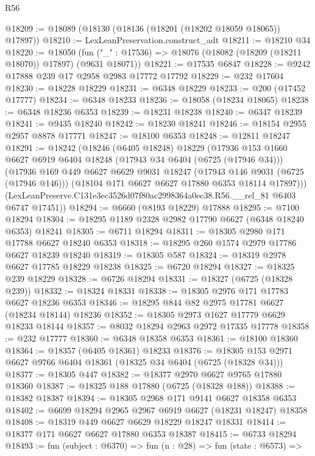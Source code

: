 \begin{lexlean}{R56}
\begin{coremodule}
@18209 := @18089 (@18130 (@18136 (@18201 (@18202 @18059 @18065)) @17897))
@18210 := LexLeanPreservation.construct_adt
@18211 := @18210 @34
@18220 := @18050
    (fun ("_" : @17536) => @18076 (@18082 (@18209 (@18211 @18070)) @17897) (@9631 @18071))
@18221 := @17535 @6847
@18228 := @9242 @17888 @239 @17 @2958 @2983 @17772 @17792
@18229 := @232 @17604
@18230 := @18228 @18229
@18231 := @6348 @18229
@18233 := @200 (@17452 @17777)
@18234 := @6348 @18233
@18236 := @18058 (@18234 @18065)
@18238 := @6348 @18236 @6353
@18239 := @18231 @18238
@18240 := @6347 @18239
@18241 := @9435 @18240
@18242 := @18230 @18241
@18246 := @18154 @2955 @2957 @8878 @17771
@18247 := @18100 @6353
@18248 := @12811 @18247
@18291 := @18242
    (@18246
      (@6405 @18248)
      @18229
      (@17936
        @153
        @1660
        @6627
        @6919
        @6404
        @18248
        (@17943 @34 @6404 (@6725 (@17946 @34)))
        (@17936
          @169
          @449
          @6627
          @6629
          @9031
          @18247
          (@17943 @146 @9031 (@6725 (@17946 @146)))
          (@18104 @171 @6627 @6627 @17880 @6353 @18114 @17897)))
      (LexLeanPreserve.C131e3ec3526d07f80ac2998364a0ec38.R56.__rel_81 @6403 @6747 @17451))
@18294 := @6660 (@8193 @18229) @17888
@18295 := @7100 @18294
@18304 := @18295 @1189 @2328 @2982 @17790 @6627 (@6348 @18240 @6353) @18241
@18305 := @6711 @18294
@18311 := @18305 @2980 @171 @17788 @6627 @18240 @6353
@18318 := @18295 @260 @1574 @2979 @17786 @6627 @18239 @18240
@18319 := @18305 @587
@18324 := @18319 @2978 @6627 @17785 @18229 @18238
@18325 := @6720 @18294
@18327 := @18325 @239 @18229
@18328 := @6726 @18294
@18331 := @18327 (@6725 (@18328 @239))
@18332 := @18324 @18331
@18338 := @18305 @2976 @171 @17783 @6627 @18236 @6353
@18346 := @18295 @844 @82 @2975 @17781 @6627 (@18234 @18144) @18236
@18352 := @18305 @2973 @1627 @17779 @6629 @18233 @18144
@18357 := @8032 @18294 @2963 @2972 @17335 @17778
@18358 := @232 @17777
@18360 := @6348 @18358 @6353
@18361 := @18100 @18360
@18364 := @18357 (@6405 @18361) @18233
@18376 := @18305 @153 @2971 @6627 @9766 @6404 @18361 (@18325 @34 @6404 (@6725 (@18328 @34)))
@18377 := @18305 @447
@18382 := @18377 @2970 @6627 @9765 @17880 @18360
@18387 := @18325 @188 @17880 (@6725 (@18328 @188))
@18388 := @18382 @18387
@18394 := @18305 @2968 @171 @9141 @6627 @18358 @6353
@18402 := @6699 @18294 @2965 @2967 @6919 @6627 (@18231 @18247) @18358
@18408 := @18319 @449 @6627 @6629 @18229 @18247 @18331
@18414 := @18377 @171 @6627 @6627 @17880 @6353 @18387
@18415 := @6733 @18294
@18493 := fun (subject : @6370) =>
  fun (n : @28) =>
  fun (state : @6573) =>

\end{coremodule}
\end{lexlean}
